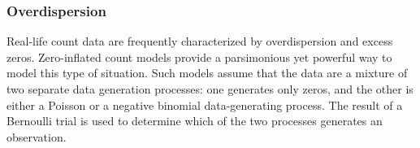 \begin{frame}
\frametitle{Overdispersion}
Real-life count data are frequently characterized by overdispersion and excess zeros. Zero-inflated count models
provide a parsimonious yet powerful way to model this type of situation. Such models assume that the data are a
mixture of two separate data generation processes: one generates only zeros, and the other is either a Poisson or
a negative binomial data-generating process. The result of a Bernoulli trial is used to determine which of the two
processes generates an observation.

\end{frame}
